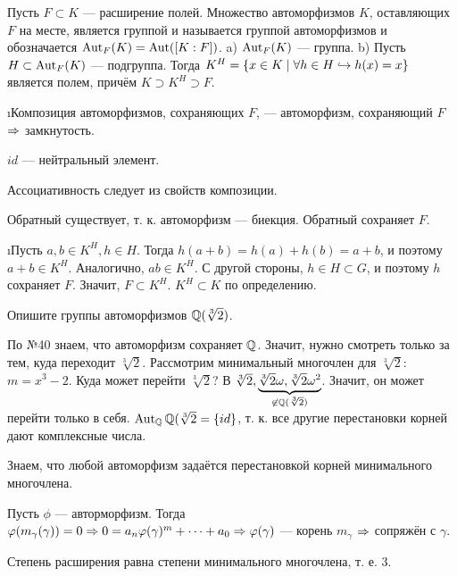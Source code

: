 \begin{problem}
Пусть $F \subset K$ — расширение полей. Множество автоморфизмов $K$, оставляющих $F$ на месте, является группой и называется группой автоморфизмов и обозначается $\operatorname{Aut}_F(K) = \operatorname{Aut}([K : F])$.
a) $\operatorname{Aut}_F(K)$ — группа.
b) Пусть $H \subset \operatorname{Aut}_F(K)$ --- подгруппа. Тогда $K^H = \{x \in K \mid \forall h \in H \hookrightarrow h(x) = x\}$ является полем, причём $K \supset K^H \supset F$.
\end{problem}

\begin{solution}
\begin{enumerate}
\def\labelenumi{\alph{enumi})}
\i Композиция автоморфизмов, сохраняющих \(F\), --- автоморфизм, сохраняющий \(F\) \(\Rightarrow\) замкнутость.

\(id\) --- нейтральный элемент.

Ассоциативность следует из свойств композиции.

Обратный существует, т. к. автоморфизм --- биекция. Обратный сохраняет \(F\).

\i Пусть \(a, b \in K^H, h \in H\). Тогда \(h(a + b) = h(a) + h(b) = a + b\), и поэтому \(a + b \in K^H\). Аналогично, \(ab \in K^H\). С другой стороны, \(h \in H \subset G\), и поэтому \(h\) сохраняет \(F\). Значит, \(F \subset K^H\).
\(K^H \subset K\) по определению.
\end{enumerate}
\end{solution}

\begin{problem}[42 (10.5)]
Опишите группы автоморфизмов $\mathbb{Q}(\sqrt[3]{2})$.
\end{problem}

\begin{solution}
По №40 знаем, что автоморфизм сохраняет $\mathbb{Q}$. Значит, нужно смотреть только за тем, куда переходит $\sqrt[3]{2}$.
Рассмотрим минимальный многочлен для $\sqrt[3]{2}$: $m = x^3-2$.
Куда может перейти $\sqrt[3]{2}$? В $\sqrt[3]{2}, \underbrace{\sqrt[3]{2}\omega, \sqrt[3]{2}\omega^2}_{\not\in \mathbb{Q}(\sqrt[3]{2})}$. Значит, он может перейти только в себя. \(\operatorname{Aut}_{\mathbb{Q}} \mathbb{Q}(\sqrt[3]{2} = \{id\}\), т. к. все другие перестановки корней дают комплексные числа.

Знаем, что любой автоморфизм задаётся перестановкой корней минимального многочлена.

Пусть \(\phi\) --- авторморфизм. Тогда \(\varphi(m_\gamma(\gamma)) = 0 \Rightarrow 0 = a_n \varphi(\gamma)^m+\dots+a_0 \Rightarrow \varphi(\gamma)\) --- корень \(m_\gamma\) \(\Rightarrow\) сопряжён с \(\gamma\).

Степень расширения равна степени минимального многочлена, т. е. $3$.
\end{solution}


